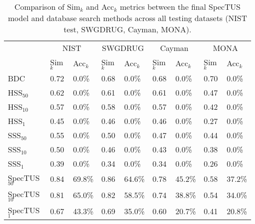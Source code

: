 

% 
\begin{table}[h!]
    \centering
    \begin{tabular}{l|l|l|l|l|l|l|l|l}
        ~ & \multicolumn{2}{c|}{NIST} & \multicolumn{2}{c|}{SWGDRUG} & \multicolumn{2}{c|}{Cayman} & \multicolumn{2}{c}{MONA} \\
        ~ & Sim$_k$ & Acc$_k$ & Sim$_k$ & Acc$_k$ & Sim$_k$ & Acc$_k$ & Sim$_k$ & Acc$_k$ \\ \hline \hline
        BDC & 0.72 & 0.0\% & 0.68 & 0.0\% & 0.68 & 0.0\% & 0.70 & 0.0\% \\ \hline
        HSS$_{50}$ & 0.62 & 0.0\% & 0.61 & 0.0\% & 0.61 & 0.0\% & 0.47 & 0.0\% \\ \hline
        HSS$_{10}$ & 0.57 & 0.0\% & 0.58 & 0.0\% & 0.57 & 0.0\% & 0.42 & 0.0\% \\ \hline
        HSS$_1$ & 0.45 & 0.0\% & 0.46 & 0.0\% & 0.46 & 0.0\% & 0.27 & 0.0\% \\ \hline
        SSS$_{50}$ & 0.55 & 0.0\% & 0.50 & 0.0\% & 0.47 & 0.0\% & 0.44 & 0.0\% \\ \hline
        SSS$_{10}$ & 0.50 & 0.0\% & 0.46 & 0.0\% & 0.43 & 0.0\% & 0.38 & 0.0\% \\ \hline
        SSS$_1$ & 0.39 & 0.0\% & 0.34 & 0.0\% & 0.34 & 0.0\% & 0.26 & 0.0\% \\ \Xhline{3\arrayrulewidth}
        SpecTUS$_{50}$ & 0.84 & 69.8\% & 0.86 & 64.6\% & 0.78 & 45.2\% & 0.58 & 37.2\% \\ \hline
        SpecTUS$_{10}$ & 0.81 & 65.0\% & 0.82 & 58.5\% & 0.74 & 38.8\% & 0.54 & 34.0\% \\ \hline
        SpecTUS$_1$ & 0.67 & 43.3\% & 0.69 & 35.0\% & 0.60 & 20.7\% & 0.41 & 20.8\% \\ \hline
    \end{tabular}
    \caption{Comparison of Sim$_k$ and Acc$_k$ metrics between the final SpecTUS model and database search methods across all testing datasets (NIST test, SWGDRUG, Cayman, MONA).}
    \label{tab:final_model_comparison}
\end{table}
% 
